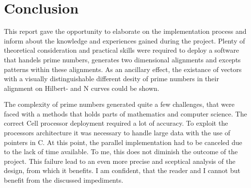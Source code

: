\section{Conclusion}
\label{sec:conclusion}


This report gave the opportunity to elaborate on the implementation process and inform about the knowledge and experiences gained during the project. Plenty of theoretical consideration and practical skills were required to deploy a software that handels prime numbers, generates two dimensional alignments and excepts patterns within these alignments. As an ancillary effect, the existance of vectors with a visually distinguishable different desity of prime numbers in their alignment on Hilbert- and N curves could be shown.

The complexity of prime numbers generated quite a few challenges, that were faced with a methods that holds parts of mathematics and computer science. The correct Cell processor deployment required a lot of accuracy. To exploit the processors architecture it was necessary to handle large data with the use of pointers in C. At this point, the parallel implementation had to be canceled due to the lack of time available. To me, this does not diminish the outcome of the project. This failure lead to an even more precise and sceptical analysis of the design, from which it benefits. I am confident, that the reader and I cannot but benefit from the discussed impediments.


